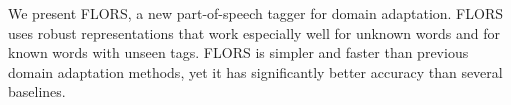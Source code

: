 We present FLORS, a new part-of-speech tagger for domain adaptation. FLORS uses robust representations that work especially well for unknown words and for known words with unseen tags. FLORS is simpler and faster than previous domain adaptation methods, yet it has significantly better accuracy than several baselines.

